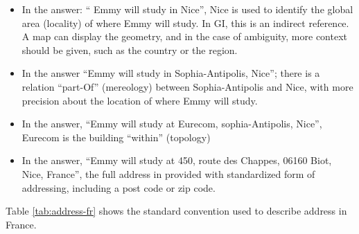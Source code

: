 \begin{itemize}
\item In the answer: `` Emmy will study in Nice'', Nice is used to identify the global area (locality) of where Emmy will study. In GI, this is an indirect reference. A map can display the geometry, and in the case of ambiguity, more context should be given, such as the country or the region.  
 \item In the answer ``Emmy will study in Sophia-Antipolis, Nice''; there is a relation ``part-Of'' (mereology) between Sophia-Antipolis and Nice, with more precision about the location of where Emmy will study.
 \item In the answer, ``Emmy will study at Eurecom, sophia-Antipolis, Nice'', Eurecom is the building ``within'' (topology)
 \item In the answer, ``Emmy will study at 450, route des Chappes, 06160 Biot, Nice, France'', the full address in provided with  standardized form of addressing, including a post code or zip code.
\end{itemize}
  
Table \ref{tab:address-fr} shows the standard convention used to describe address in France. 

\begin{table}[!htbp]
\end{table}

